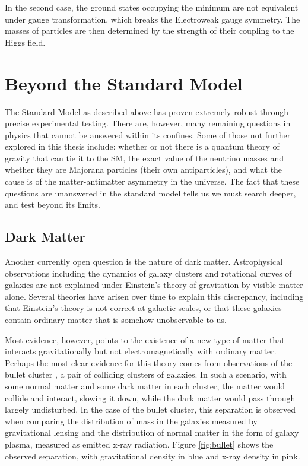 In the second case, the ground states occupying the minimum are not equivalent under gauge transformation, which breaks the Electroweak gauge symmetry. The masses of particles are then determined by the strength of their coupling to the Higgs field.

\section{Beyond the Standard Model}
The Standard Model as described above has proven extremely robust through precise experimental testing. There are, however, many remaining questions in physics that cannot be answered within its confines. Some of those not further explored in this thesis include: whether or not there is a quantum theory of gravity that can tie it to the SM, the exact value of the neutrino masses and whether they are Majorana particles (their own antiparticles), and what the cause is of the matter-antimatter asymmetry in the universe. The fact that these questions are unanswered in the standard model tells us we must search deeper, and test beyond its limits.

\subsection{Dark Matter}
Another currently open question is the nature of dark matter. Astrophysical observations including the dynamics of galaxy clusters \cite{Zwicky} and rotational curves of galaxies \cite{Rubin} are not explained under Einstein's theory of gravitation by visible matter alone. Several theories have arisen over time to explain this discrepancy, including that Einstein's theory is not correct at galactic scales, or that these galaxies contain ordinary matter that is somehow unobservable to us. 

Most evidence, however, points to the existence of a new type of matter that interacts gravitationally but not electromagnetically with ordinary matter. Perhaps the most clear evidence for this theory comes from observations of the bullet cluster \cite{Clowe}, a pair of colliding clusters of galaxies. In such a scenario, with some normal matter and some dark matter in each cluster, the matter would collide and interact, slowing it down, while the dark matter would pass through largely undisturbed. In the case of the bullet cluster, this separation is observed when comparing the distribution of mass in the galaxies measured by gravitational lensing and the distribution of normal matter in the form of galaxy plasma, measured as emitted x-ray radiation. Figure \ref{fig:bullet} shows the observed separation, with gravitational density in blue and x-ray density in pink.

